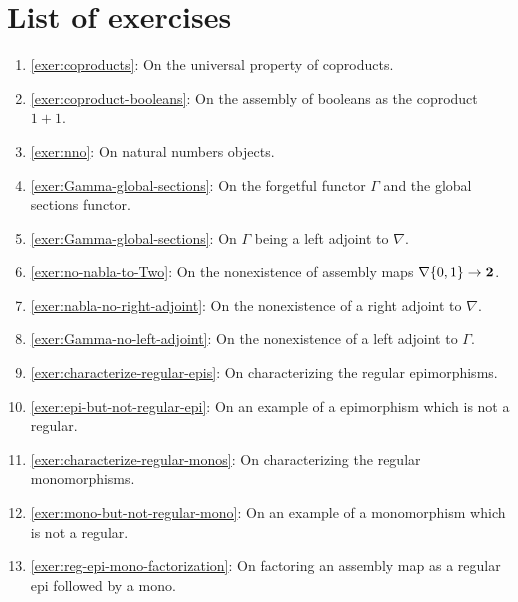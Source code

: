 \section{List of exercises}
\begin{enumerate}
\item \cref{exer:coproducts}: On the universal property of coproducts.
\item \cref{exer:coproduct-booleans}: On the assembly of booleans as the
  coproduct \(1 + 1\).
\item \cref{exer:nno}: On natural numbers objects.
\item \cref{exer:Gamma-global-sections}: On the forgetful functor \(\Gamma\) and
  the global sections functor.
\item \cref{exer:Gamma-global-sections}: On \(\Gamma\) being a left adjoint to
  \(\nabla\).
\item \cref{exer:no-nabla-to-Two}: On the nonexistence of assembly maps
  \(\nabla\{0,1\} \to \mathbf 2\).
\item \cref{exer:nabla-no-right-adjoint}: On the nonexistence of a right
  adjoint to \(\nabla\).
\item \cref{exer:Gamma-no-left-adjoint}: On the nonexistence of a left
  adjoint to \(\Gamma\).
\item \cref{exer:characterize-regular-epis}: On characterizing the regular
  epimorphisms.
\item \cref{exer:epi-but-not-regular-epi}: On an example of a epimorphism
  which is not a regular.
\item \cref{exer:characterize-regular-monos}: On characterizing the regular
  monomorphisms.
\item \cref{exer:mono-but-not-regular-mono}: On an example of a monomorphism
  which is not a regular.
\item \cref{exer:reg-epi-mono-factorization}: On factoring an assembly map as a
  regular epi followed by a mono.
\end{enumerate}

